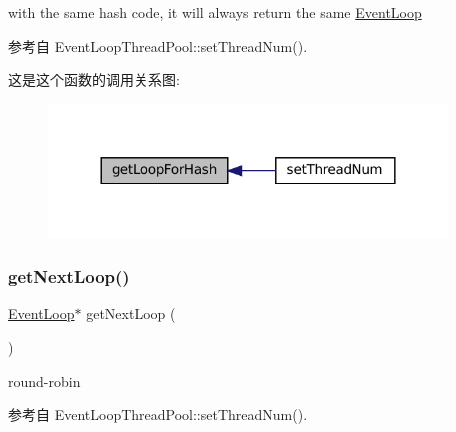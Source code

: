 with the same hash code, it will always return the same \hyperlink{classmuduo_1_1net_1_1EventLoop}{Event\+Loop} 



参考自 Event\+Loop\+Thread\+Pool\+::set\+Thread\+Num().

这是这个函数的调用关系图\+:
\nopagebreak
\begin{figure}[H]
\begin{center}
\leavevmode
\includegraphics[width=300pt]{classmuduo_1_1net_1_1EventLoopThreadPool_a7aeeb1513af12dbff3370e780589fb3f_icgraph}
\end{center}
\end{figure}
\mbox{\label{classmuduo_1_1net_1_1EventLoopThreadPool_a32e25dd75cf32dae17aa6c8156ec1a89}} 
\subsubsection{\texorpdfstring{get\+Next\+Loop()}{getNextLoop()}}
{\footnotesize\ttfamily \hyperlink{classmuduo_1_1net_1_1EventLoop}{Event\+Loop}$\ast$ get\+Next\+Loop (\begin{DoxyParamCaption}{ }\end{DoxyParamCaption})}



round-\/robin 



参考自 Event\+Loop\+Thread\+Pool\+::set\+Thread\+Num().

